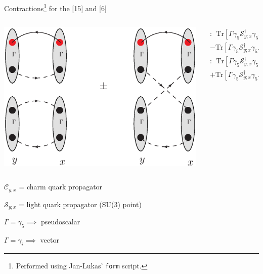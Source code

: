 \documentclass{beamer}
\begin{document}
\begin{frame}{Contractions\footnote{Performed using Jan-Lukas' \texttt{form} script.} for the [15] and [6]}
\begin{columns}
\begin{column}{.4\textwidth}
\center
\includegraphics[width=\columnwidth]{../notes/contract1.eps}
\end{column}
\begin{column}{.6\textwidth}
\tiny
\begin{multline*}
[15]:\ \ \text{Tr}\left[\Gamma \gamma_5\mathcal{S}_{y;x}^\dag\gamma_5\Gamma\mathcal{S}_{y;x}\right]
\text{Tr}\left[\Gamma \gamma_5\mathcal{S}_{y;x}^\dag\gamma_5\Gamma\mathcal{C}_{y;x}\right]\\
-\text{Tr}\left[\Gamma \gamma_5\mathcal{S}_{y;x}^\dag\gamma_5\Gamma\mathcal{S}_{y;x}\Gamma \gamma_5\mathcal{S}_{y;x}^\dag\gamma_5\Gamma\mathcal{C}_{y;x}\right]
\end{multline*}
\begin{multline*}
[6]:\ \ \text{Tr}\left[\Gamma \gamma_5\mathcal{S}_{y;x}^\dag\gamma_5\Gamma\mathcal{S}_{y;x}\right]
\text{Tr}\left[\Gamma \gamma_5\mathcal{S}_{y;x}^\dag\gamma_5\Gamma\mathcal{C}_{y;x}\right]\\
+\text{Tr}\left[\Gamma \gamma_5\mathcal{S}_{y;x}^\dag\gamma_5\Gamma\mathcal{S}_{y;x}\Gamma \gamma_5\mathcal{S}_{y;x}^\dag\gamma_5\Gamma\mathcal{C}_{y;x}\right]
\end{multline*}
\end{column}
\end{columns}
\center
\footnotesize
$\mathcal{C}_{y;x}$ = charm quark propagator

$\mathcal{S}_{y;x}$ = light quark propagator (SU(3) point)

$\Gamma=\gamma_5\implies$ pseudoscalar

$\Gamma=\gamma_i\implies$ vector
\end{frame}
\end{document}
